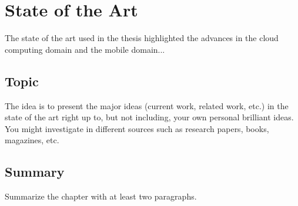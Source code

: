 
\chapter{State of the Art} %


The state of the art used in the thesis highlighted the advances in the cloud computing domain and the mobile domain...


\ifpdf
    \graphicspath{{X/figures/PNG/}{X/figures/PDF/}{X/figures/}}
\else
    \graphicspath{{X/figures/EPS/}{X/figures/}}
\fi



\section{Topic}
The idea is to present  the major ideas (current work, related work, etc.) in the state of the art right up to, but not including, your own personal brilliant ideas.  You might investigate in different sources such as research papers, books, magazines, etc.





\section{Summary}
Summarize the chapter with at least two paragraphs.




